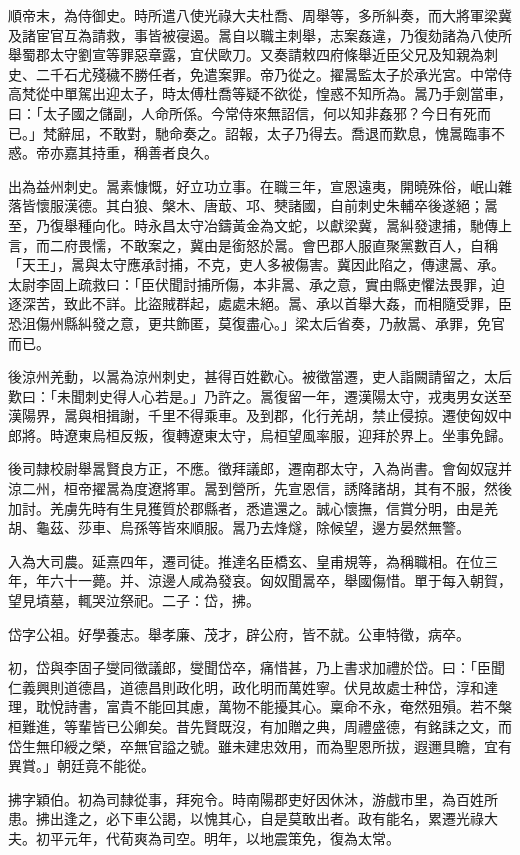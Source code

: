 \begin{pinyinscope}
順帝末，為侍御史。時所遣八使光祿大夫杜喬、周舉等，多所糾奏，而大將軍梁冀及諸宦官互為請救，事皆被寑遏。暠自以職主刺舉，志案姦違，乃復劾諸為八使所舉蜀郡太守劉宣等罪惡章露，宜伏歐刀。又奏請敕四府條舉近臣父兄及知親為刺史、二千石尤殘穢不勝任者，免遣案罪。帝乃從之。擢暠監太子於承光宮。中常侍高梵從中單駕出迎太子，時太傅杜喬等疑不欲從，惶惑不知所為。暠乃手劍當車，曰：「太子國之儲副，人命所係。今常侍來無詔信，何以知非姦邪？今日有死而已。」梵辭屈，不敢對，馳命奏之。詔報，太子乃得去。喬退而歎息，愧暠臨事不惑。帝亦嘉其持重，稱善者良久。

出為益州刺史。暠素慷慨，好立功立事。在職三年，宣恩遠夷，開曉殊俗，岷山雜落皆懷服漢德。其白狼、槃木、唐菆、邛、僰諸國，自前刺史朱輔卒後遂絕；暠至，乃復舉種向化。時永昌太守冶鑄黃金為文蛇，以獻梁冀，暠糾發逮捕，馳傳上言，而二府畏懦，不敢案之，冀由是銜怒於暠。會巴郡人服直聚黨數百人，自稱「天王」，暠與太守應承討捕，不克，吏人多被傷害。冀因此陷之，傳逮暠、承。太尉李固上疏救曰：「臣伏聞討捕所傷，本非暠、承之意，實由縣吏懼法畏罪，迫逐深苦，致此不詳。比盜賊群起，處處未絕。暠、承以首舉大姦，而相隨受罪，臣恐沮傷州縣糾發之意，更共飾匿，莫復盡心。」梁太后省奏，乃赦暠、承罪，免官而已。

後涼州羌動，以暠為涼州刺史，甚得百姓歡心。被徵當遷，吏人詣闕請留之，太后歎曰：「未聞刺史得人心若是。」乃許之。暠復留一年，遷漢陽太守，戎夷男女送至漢陽界，暠與相揖謝，千里不得乘車。及到郡，化行羌胡，禁止侵掠。遷使匈奴中郎將。時遼東烏桓反叛，復轉遼東太守，烏桓望風率服，迎拜於界上。坐事免歸。

後司隸校尉舉暠賢良方正，不應。徵拜議郎，遷南郡太守，入為尚書。會匈奴寇并涼二州，桓帝擢暠為度遼將軍。暠到營所，先宣恩信，誘降諸胡，其有不服，然後加討。羌虜先時有生見獲質於郡縣者，悉遣還之。誠心懷撫，信賞分明，由是羌胡、龜茲、莎車、烏孫等皆來順服。暠乃去烽燧，除候望，邊方晏然無警。

入為大司農。延熹四年，遷司徒。推達名臣橋玄、皇甫規等，為稱職相。在位三年，年六十一薨。并、涼邊人咸為發哀。匈奴聞暠卒，舉國傷惜。單于每入朝賀，望見墳墓，輒哭泣祭祀。二子：岱，拂。

岱字公祖。好學養志。舉孝廉、茂才，辟公府，皆不就。公車特徵，病卒。

初，岱與李固子燮同徵議郎，燮聞岱卒，痛惜甚，乃上書求加禮於岱。曰：「臣聞仁義興則道德昌，道德昌則政化明，政化明而萬姓寧。伏見故處士种岱，淳和達理，耽悅詩書，富貴不能回其慮，萬物不能擾其心。稟命不永，奄然殂殞。若不槃桓難進，等輩皆已公卿矣。昔先賢既沒，有加贈之典，周禮盛德，有銘誄之文，而岱生無印綬之榮，卒無官謚之號。雖未建忠效用，而為聖恩所拔，遐邇具瞻，宜有異賞。」朝廷竟不能從。

拂字穎伯。初為司隸從事，拜宛令。時南陽郡吏好因休沐，游戲市里，為百姓所患。拂出逢之，必下車公謁，以愧其心，自是莫敢出者。政有能名，累遷光祿大夫。初平元年，代荀爽為司空。明年，以地震策免，復為太常。


\end{pinyinscope}
